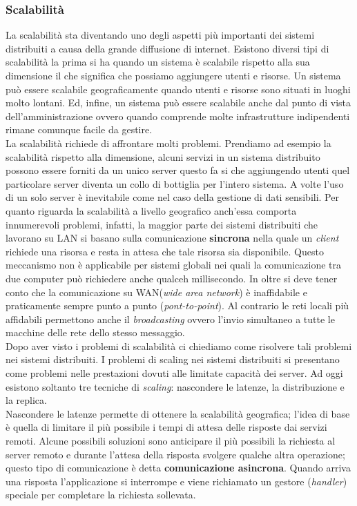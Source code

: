\subsubsection{Scalabilità}
La scalabilità sta diventando uno degli aspetti più importanti dei sistemi distribuiti a causa della grande diffusione di internet. Esistono diversi tipi di scalabilità la prima si ha quando un sistema è scalabile rispetto alla sua dimensione il che significa che possiamo aggiungere utenti e risorse. Un sistema può essere scalabile geograficamente quando utenti e risorse sono situati in luoghi molto lontani.
Ed, infine, un sistema può essere scalabile anche dal punto di vista dell'amministrazione ovvero quando comprende molte infrastrutture indipendenti rimane comunque facile da gestire.\\
La scalabilità richiede di affrontare molti problemi. Prendiamo ad esempio la scalabilità rispetto alla dimensione, alcuni servizi in un sistema distribuito possono essere forniti da un unico server questo fa si che aggiungendo utenti quel particolare server diventa un collo di bottiglia per l'intero sistema. A volte l'uso di un solo server è inevitabile come nel caso della gestione di dati sensibili.
Per quanto riguarda la scalabilità a livello geografico anch'essa comporta innumerevoli problemi, infatti, la maggior parte dei sistemi distribuiti che lavorano su LAN si basano sulla comunicazione \textbf{sincrona} nella quale un \emph{client} richiede una risorsa e resta in attesa che tale risorsa sia disponibile. Questo meccanismo non è applicabile per sistemi globali nei quali la comunicazione tra due computer può richiedere anche qualceh millisecondo. In oltre si deve tener conto che la comunicazione su WAN(\emph{wide area network}) è inaffidabile e praticamente sempre punto a punto (\emph{pont-to-point}). Al contrario le reti locali più affidabili permettono anche il \emph{broadcasting} ovvero l'invio simultaneo a tutte le macchine delle rete dello stesso messaggio.\\
Dopo aver visto i problemi di scalabilità ci chiediamo come risolvere tali problemi nei sistemi distribuiti. I problemi di scaling nei sistemi distribuiti si presentano come problemi nelle prestazioni dovuti alle limitate capacità dei server. Ad oggi esistono soltanto tre tecniche di \emph{scaling}: nascondere le latenze, la distribuzione e la replica.\\
Nascondere le latenze permette di ottenere la scalabilità geografica; l'idea di base è quella di limitare il più possibile i tempi di attesa delle risposte dai servizi remoti. Alcune possibili soluzioni sono anticipare il più possibili la richiesta al server remoto e durante l'attesa della risposta svolgere qualche altra operazione; questo tipo di comunicazione è detta \textbf{comunicazione asincrona}. Quando arriva una risposta l'applicazione si interrompe e viene richiamato un gestore (\emph{handler}) speciale per completare la richiesta sollevata.
